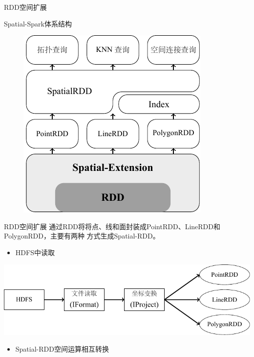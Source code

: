 \begin{frame}[c]{RDD空间扩展}
    \begin{center}
        \alert{Spatial-Spark体系结构}
    

    \vspace{1em}
    \begin{figure}
        \includegraphics[scale=1.0]{figures/spatialspark.pdf}
    \end{figure}
    \end{center}
\end{frame}

\begin{frame}[c]{RDD空间扩展}
    通过RDD将将点、线和面封装成PointRDD、LineRDD和PolygonRDD，主要有两种
    方式生成Spatial-RDD。
    \pause
    \begin{itemize}
        \item HDFS中读取
    \end{itemize}
    \includegraphics[scale=0.8]{figures/spatialRDD.pdf}

    \pause
    \begin{itemize}
        \item Spatial-RDD空间运算相互转换
    \end{itemize}
\end{frame}

